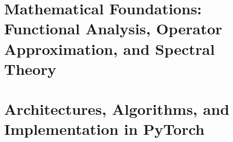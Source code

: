 \documentclass[11pt,a4paper,twoside,openright]{book}
\theoremstyle{plain}
\theoremstyle{definition}
\theoremstyle{remark}
\begin{document}
\cleardoublepage
{}
{}
\tableofcontents
\cleardoublepage
{}
{}
\listoffigures
\cleardoublepage
{}
{}
\listoftables
\cleardoublepage
{}
{}
\lstlistoflistings
\cleardoublepage




\mainmatter

\part{Mathematical Foundations: Functional Analysis, Operator
Approximation, and Spectral Theory}
\label{part:1}











\part{Architectures, Algorithms, and Implementation in PyTorch}
\label{part:2}








\end{document}
